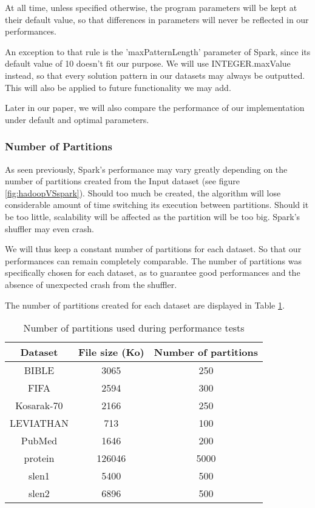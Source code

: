 \documentclass{eplmastersthesis}
\begin{document}
At all time, unless specified otherwise, the program parameters will be kept at their default value, so that differences in parameters will never be reflected in our performances.\newline

An exception to that rule is the 'maxPatternLength' parameter of Spark, since its default value of 10 doesn't fit our purpose. We will use INTEGER.maxValue instead, so that every solution pattern in our datasets may always be outputted. This will also be applied to future functionality we may add. \newline

Later in our paper, we will also compare the performance of our implementation under default and optimal parameters.

\subsubsection{Number of Partitions}

As seen previously, Spark's performance may vary greatly depending on the number of partitions created from the Input dataset (see figure \ref{fig:hadoopVSspark}). Should too much be created, the algorithm will lose considerable amount of time switching its execution between partitions. Should it be too little, scalability will be affected as the partition will be too big. Spark's shuffler may even crash. \newline

We will thus keep a constant number of partitions for each dataset. So that our performances can remain completely comparable. The number of partitions was specifically chosen for each dataset, as to guarantee good performances and the absence of unexpected crash from the shuffler. \newline

The number of partitions created for each dataset are displayed in Table \ref{tab:numPartitions}.

\begin{table}[h]
  \centering
  \begin{tabular}{| c | c | c |}
  	\hline
  	Dataset & File size (Ko) & Number of partitions \\
  	\hline
  	BIBLE & 3065 & 250 \\
  	\hline
  	FIFA & 2594 &300\\
  	\hline
  	Kosarak-70 & 2166 & 250\\
  	\hline  
  	LEVIATHAN & 713 & 100\\
  	\hline
  	PubMed & 1646 & 200\\
  	\hline
  	protein & 126046 & 5000\\
  	\hline
  	slen1 & 5400 & 500\\
 	\hline 
  	slen2 & 6896 & 500\\
  	\hline
  \end{tabular}
  \caption{Number of partitions used during performance tests}
  \label{tab:numPartitions}
\end{table}
\end{document}
